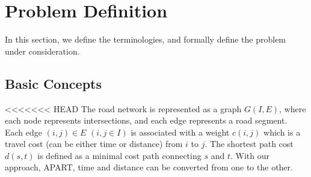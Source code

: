 \section{Problem Definition}
\label{sec:problem_def}

In this section, we define the terminologies, and formally define the problem under consideration.

\subsection{Basic Concepts}
<<<<<<< HEAD
The road network is represented as a graph $G(I, E)$, where each node represents intersections, and each edge represents a road segment. 
Each edge $(i,j) \in E$ $(i, j \in I)$ is associated with a weight $c(i,j)$ which is a travel cost (can be either time or distance) from $i$ to $j$.
The shortest path cost $d(s,t)$ is defined as a minimal cost path connecting $s$ and $t$. With our approach, APART, time and distance can be converted from one to the other.

